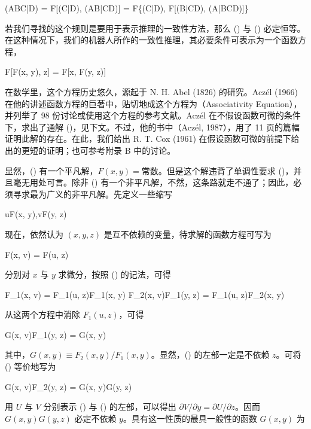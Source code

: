 \placeformula[subeq:2]
\startformula
(ABC|D) = F[(C|D), (AB|CD)] = F\{(C|D), F[(B|CD), (A|BCD)]\}
\stopformula
\stopsubformulas

若我们寻找的这个规则是要用于表示推理的一致性方法，那么 (\in[subeq:1]) 与 (\in[subeq:2]) 必定恒等。在这种情况下，我们的机器人所作的一致性推理，其必要条件可表示为一个函数方程，

\placeformula[function-eq]
\startformula
F[F(x, y), z] = F[x, F(y, z)]
\stopformula

在数学里，这个方程历史悠久，源起于 N. H. Abel (1826) 的研究。Acz\'el (1966) 在他的讲述函数方程的巨著中，贴切地成这个方程为（Associativity Equation），并列举了 98 份讨论或使用这个方程的参考文献。Acz\'el 在不假设函数可微的条件下，求出了通解 ()，见下文。不过，他的书中（Acz\'el, 1987），用了 11 页的篇幅证明此解的存在。在此，我们给出 R. T. Cox (1961) 在假设函数可微的前提下给出的更短的证明；也可参考附录 B 中的讨论。

显然，(\in[function-eq]) 有一个平凡解，$F(x, y) = \text{常数}$。但是这个解违背了单调性要求 ()，并且毫无用处可言。除非 (\in[function-eq]) 有一个非平凡解，不然，这条路就走不通了；因此，必须寻求最为广义的非平凡解。先定义一些缩写

\placeformula
\startformula
u\equiv F(x, y),\quad v\equiv F(y, z)
\stopformula

现在，依然认为 $(x, y, z)$ 是互不依赖的变量，待求解的函数方程可写为

\placeformula[eq-target]
\startformula
F(x, v) = F(u, z)
\stopformula

分别对 $x$ 与 $y$ 求微分，按照 () 的记法，可得

\placeformula[elim]
\startformula
\startmathalignment
\NC F_1(x, v) \NC = F_1(u, z)F_1(x, y)\NR
\NC F_2(x, v)F_1(y, z) \NC = F_1(u, z)F_2(x, y)\NR
\stopmathalignment
\stopformula

从这两个方程中消除 $F_1(u, z)$，可得

\placeformula[eq-U]
\startformula
G(x, v)F_1(y, z) = G(x, y)
\stopformula

其中，$G(x, y)\equiv F_2(x, y)/F_1(x, y)$。显然，(\in[elim]) 的左部一定是不依赖 $z$。可将 (\in[eq-U]) 等价地写为

\placeformula[eq-V]
\startformula
G(x, v)F_2(y, z) = G(x, y)G(y, z)
\stopformula

用 $U$ 与 $V$ 分别表示 (\in[eq-U]) 与 (\in[eq-V]) 的左部，可以得出 $\partial V/\partial y = \partial U/\partial z$。因而 $G(x, y)G(y, z)$ 必定不依赖 $y$。具有这一性质的最具一般性的函数 $G(x, y)$ 为

